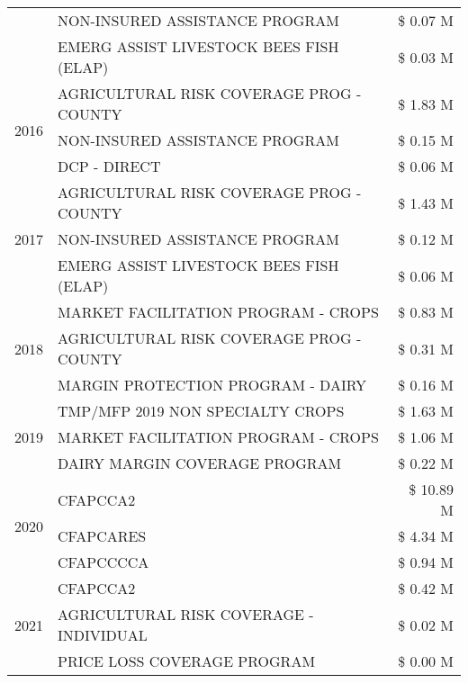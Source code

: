 \begin{tabular}{llr}
 & NON-INSURED ASSISTANCE PROGRAM & \$ 0.07 M \\
 & EMERG ASSIST LIVESTOCK BEES FISH (ELAP) & \$ 0.03 M \\
\cline{1-3}
\multirow[t]{3}{*}{2016} & AGRICULTURAL RISK COVERAGE PROG - COUNTY & \$ 1.83 M \\
 & NON-INSURED ASSISTANCE PROGRAM & \$ 0.15 M \\
 & DCP - DIRECT & \$ 0.06 M \\
\cline{1-3}
\multirow[t]{3}{*}{2017} & AGRICULTURAL RISK COVERAGE PROG - COUNTY & \$ 1.43 M \\
 & NON-INSURED ASSISTANCE PROGRAM & \$ 0.12 M \\
 & EMERG ASSIST LIVESTOCK BEES FISH (ELAP) & \$ 0.06 M \\
\cline{1-3}
\multirow[t]{3}{*}{2018} & MARKET FACILITATION PROGRAM - CROPS & \$ 0.83 M \\
 & AGRICULTURAL RISK COVERAGE PROG - COUNTY & \$ 0.31 M \\
 & MARGIN PROTECTION PROGRAM - DAIRY & \$ 0.16 M \\
\cline{1-3}
\multirow[t]{3}{*}{2019} & TMP/MFP 2019 NON SPECIALTY CROPS & \$ 1.63 M \\
 & MARKET FACILITATION PROGRAM - CROPS & \$ 1.06 M \\
 & DAIRY MARGIN COVERAGE PROGRAM & \$ 0.22 M \\
\cline{1-3}
\multirow[t]{3}{*}{2020} & CFAPCCA2 & \$ 10.89 M \\
 & CFAPCARES & \$ 4.34 M \\
 & CFAPCCCCA & \$ 0.94 M \\
\cline{1-3}
\multirow[t]{3}{*}{2021} & CFAPCCA2 & \$ 0.42 M \\
 & AGRICULTURAL RISK COVERAGE - INDIVIDUAL & \$ 0.02 M \\
 & PRICE LOSS COVERAGE PROGRAM & \$ 0.00 M \\
\cline{1-3}
\bottomrule
\end{tabular}
